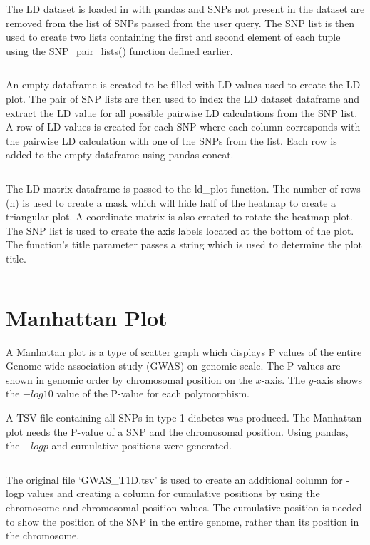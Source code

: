 \documentclass[12pt,a4paper]{article}
\newcommand{\mintfile}[1]{
\begin{tcolorbox}[colback=gray!5!white,%
	grow to left by=20mm,
    grow to right by=20mm,
    sharp corners]{{    \small \inputminted[breaklines]{python}{#1}		}}
\end{tcolorbox}}
\newcommand{\sect}[1]{
\clearpage
\hypertarget{#1}{
\section{#1}\label{#1}}
}
\begin{document}
The LD dataset is loaded in with pandas and SNPs not present in the dataset are removed from the list of SNPs passed from the user query. The SNP list is then used to create two lists containing the first and second element of each tuple using the SNP\_pair\_lists() function defined earlier.
\mintfile{code_snippets/placeholder.py}

An empty dataframe is created to be filled with LD values used to create the LD plot. The pair of SNP lists are then used to index the LD dataset dataframe and extract the LD value for all possible pairwise LD calculations from the SNP list. A row of LD values is created for each SNP where each column corresponds with the pairwise LD calculation with one of the SNPs from the list. Each row is added to the empty dataframe using pandas concat.
\mintfile{code_snippets/placeholder.py}

The LD matrix dataframe is passed to the ld\_plot function. The number of rows (n) is used to create a mask which will hide half of the heatmap to create a triangular plot. A coordinate matrix is also created to rotate the heatmap plot. The SNP list is used to create the axis labels located at the bottom of the plot. The function’s title parameter passes a string which is used to determine the plot title.
\mintfile{code_snippets/placeholder.py}

\sect{Manhattan Plot}

A Manhattan plot is a type of scatter graph which displays P values of the entire Genome-wide association study (GWAS) on genomic scale. The P-values are shown in genomic order by chromosomal position on the $x$-axis. The $y$-axis shows the $-log10$ value of the P-value for each polymorphism.

A TSV file containing all SNPs in type 1 diabetes was produced. The Manhattan plot needs the P-value of a SNP and the chromosomal position. Using pandas, the $-logp$ and cumulative positions were generated.

\mintfile{code_snippets/manPlot/createTSV.py}
The original file `GWAS\_T1D.tsv’ is used to create an additional column for -logp values and creating a column for cumulative positions by using the chromosome and chromosomal position values.
The cumulative position is needed to show the position of the SNP in the entire genome, rather than its position in the chromosome.
\end{document}
